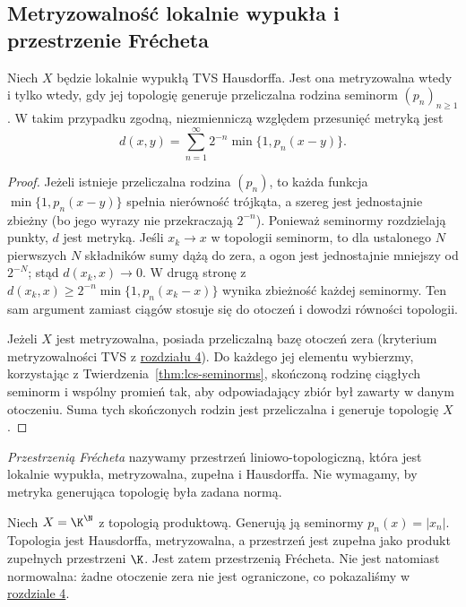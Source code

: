 \subsection{Metryzowalność lokalnie wypukła i przestrzenie Frécheta}

\begin{twierdzenie}
\label{thm:countable-seminorms}
Niech $X$ będzie lokalnie wypukłą TVS Hausdorffa.
Jest ona metryzowalna wtedy i tylko wtedy, gdy jej topologię
generuje przeliczalna rodzina seminorm $(p_n)_{n\ge1}$.
W takim przypadku zgodną, niezmienniczą względem przesunięć
metryką jest
\[
 d(x,y)=\sum_{n=1}^{\infty}2^{-n}\min\{1,p_n(x-y)\}.
\]
\end{twierdzenie}
\begin{proof}
Jeżeli istnieje przeliczalna rodzina $(p_n)$,
to każda funkcja $\min\{1,p_n(x-y)\}$ spełnia
nierówność trójkąta, a szereg jest jednostajnie zbieżny
(bo jego wyrazy nie przekraczają $2^{-n}$).
Ponieważ seminormy rozdzielają punkty, $d$ jest metryką.
Jeśli $x_k\to x$ w topologii seminorm, to dla ustalonego
$N$ pierwszych $N$ składników sumy dążą do zera,
a ogon jest jednostajnie mniejszy od $2^{-N}$;
stąd $d(x_k,x)\to0$. W drugą stronę z
$d(x_k,x)\ge2^{-n}\min\{1,p_n(x_k-x)\}$
wynika zbieżność każdej seminormy. Ten sam argument
zamiast ciągów stosuje się do otoczeń i dowodzi
równości topologii.

Jeżeli $X$ jest metryzowalna, posiada przeliczalną bazę
otoczeń zera (kryterium metryzowalności TVS z \hyperref[sec:rodziny-metryzowalnosc]{rozdziału 4}).
Do każdego jej elementu wybierzmy, korzystając z
Twierdzenia~\ref{thm:lcs-seminorms}, skończoną rodzinę
ciągłych seminorm i wspólny promień tak, aby odpowiadający
zbiór był zawarty w danym otoczeniu. Suma tych skończonych
rodzin jest przeliczalna i generuje topologię $X$.
\end{proof}

\begin{definicja}
\label{def:frechet-space}
\emph{Przestrzenią Frécheta} nazywamy przestrzeń
liniowo-topologiczną, która jest lokalnie wypukła,
metryzowalna, zupełna i Hausdorffa. Nie wymagamy, by
metryka generująca topologię była zadana normą.
\end{definicja}

\begin{przyklad}
\label{ex:product-lcs}
Niech $X=\K^{\N}$ z topologią produktową.
Generują ją seminormy $p_n(x)=|x_n|$.
Topologia jest Hausdorffa, metryzowalna, a przestrzeń
jest zupełna jako produkt zupełnych przestrzeni $\K$.
Jest zatem przestrzenią Frécheta. Nie jest natomiast
normowalna: żadne otoczenie zera nie jest ograniczone,
co pokazaliśmy w \hyperref[sec:rodziny-metryzowalnosc]{rozdziale 4}.
\end{przyklad}

